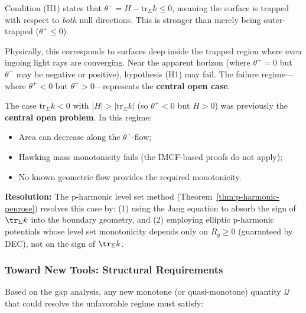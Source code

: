 \begin{remark}
Condition (H1) states that $\theta^- = H - \mathrm{tr}_\Sigma k \leq 0$, meaning the surface is trapped with respect to \emph{both} null directions. This is stronger than merely being outer-trapped ($\theta^+ \leq 0$). 

Physically, this corresponds to surfaces deep inside the trapped region where even ingoing light rays are converging. Near the apparent horizon (where $\theta^+ = 0$ but $\theta^-$ may be negative or positive), hypothesis (H1) may fail. The failure regime---where $\theta^+ < 0$ but $\theta^- > 0$---represents the \textbf{central open case}.
\end{remark}

\begin{remark}
\label{rem:unfavorable}
The case $\mathrm{tr}_\Sigma k < 0$ with $|H| > |\mathrm{tr}_\Sigma k|$ (so $\theta^+ < 0$ but $H > 0$) was previously the \textbf{central open problem}. In this regime:
\begin{itemize}
\item Area can decrease along the $\theta^+$-flow;
\item Hawking mass monotonicity fails (the IMCF-based proofs do not apply);
\item No known geometric flow provides the required monotonicity.
\end{itemize}
\textbf{Resolution:} The p-harmonic level set method (Theorem~\ref{thm:p-harmonic-penrose}) resolves this case by: (1) using the Jang equation to absorb the sign of $\tr_\Sigma k$ into the boundary geometry, and (2) employing elliptic p-harmonic potentials whose level set monotonicity depends only on $R_{\bar{g}} \geq 0$ (guaranteed by DEC), not on the sign of $\tr_\Sigma k$.
\end{remark}

\subsubsection{Toward New Tools: Structural Requirements}
\label{subsec:new-tools}

Based on the gap analysis, any new monotone (or quasi-monotone) quantity $\mathcal{Q}$ that could resolve the unfavorable regime must satisfy:

